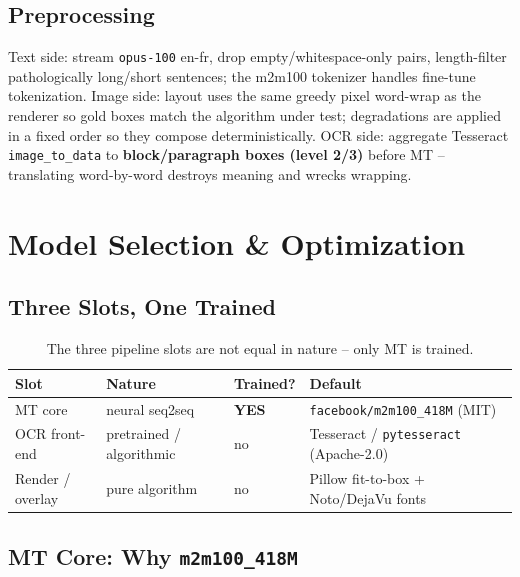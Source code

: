 \documentclass[12pt,a4paper]{article}
\begin{document}
\subsection{Preprocessing}

Text side: stream \texttt{opus-100} en-fr, drop empty/whitespace-only pairs, length-filter pathologically long/short sentences; the m2m100 tokenizer handles fine-tune tokenization. Image side: layout uses the same greedy pixel word-wrap as the renderer so gold boxes match the algorithm under test; degradations are applied in a fixed order so they compose deterministically. OCR side: aggregate Tesseract \texttt{image\_to\_data} to \textbf{block/paragraph boxes (level 2/3)} before MT -- translating word-by-word destroys meaning and wrecks wrapping.

\section{Model Selection \& Optimization}

\subsection{Three Slots, One Trained}

\begin{table}[H]
\centering
\caption{The three pipeline slots are not equal in nature -- only MT is trained.}
\small
\begin{tabularx}{\linewidth}{@{} l l l L @{}}
\toprule
\textbf{Slot} & \textbf{Nature} & \textbf{Trained?} & \textbf{Default} \\
\midrule
MT core & neural seq2seq & \textbf{YES} & \texttt{facebook/m2m100\_418M} (MIT) \\
OCR front-end & pretrained / algorithmic & no & Tesseract / \texttt{pytesseract} (Apache-2.0) \\
Render / overlay & pure algorithm & no & Pillow fit-to-box + Noto/DejaVu fonts \\
\bottomrule
\end{tabularx}
\end{table}

\subsection{MT Core: Why \texttt{m2m100\_418M}}
\end{document}
